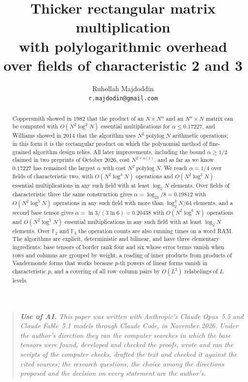 \documentclass[11pt]{article}
\title{Thicker rectangular matrix multiplication\\ with polylogarithmic overhead\\ over fields of characteristic 2 and 3}
\author{Ruhollah Majdoddin\\ \normalsize\texttt{r.majdodin@gmail.com}}
\date{}
\theoremstyle{definition}
\theoremstyle{remark}
\newcommand{\F}{\mathbb{F}}
\DeclareMathOperator{\polylog}{polylog}
\begin{document}
\maketitle

\begin{abstract}
Coppersmith showed in 1982 that the product of an $N\times N^\alpha$ and an $N^\alpha\times N$ matrix can be computed with $O(N^2\log^2N)$ essential multiplications for $\alpha\le0.17227$, and Williams showed in 2014 that the algorithm uses $N^2\polylog N$ arithmetic operations; in this form it is the rectangular product on which the polynomial method of fine-grained algorithm design relies. All later improvements, including the bound $\alpha\ge1/2$ claimed in two preprints of October 2026, cost $N^{2+o(1)}$, and as far as we know $0.17227$ has remained the largest $\alpha$ with cost $N^2\polylog N$. We reach $\alpha=1/4$ over fields of characteristic two, with $O(N^2\log^4N)$ operations and $O(N^2\log^3N)$ essential multiplications in any such field with at least $\log_2N$ elements. Over fields of characteristic three the same construction gives $\alpha=\log_23/8=0.19812$ with $O(N^2\log^5N)$ operations in any such field with more than $\log_2^3N/64$ elements, and a second base tensor gives $\alpha=\ln3/(3\ln6)=0.20438$ with $O(N^2\log^6N)$ operations and $O(N^2\log^5N)$ essential multiplications in any such field with at least $\log_2N$ elements. Over $\F_2$ and $\F_3$ the operation counts are also running times on a word RAM. The algorithms are explicit, deterministic and bilinear, and have three elementary ingredients: base tensors of border rank four and six whose error terms vanish when rows and columns are grouped by weight, a reading of inner products from products of Vandermonde forms that works because $p$-th powers of linear forms vanish in characteristic $p$, and a covering of all row--column pairs by $O(L^2)$ relabelings of $L$ levels.
\end{abstract}

\begin{quote}\small\itshape
\textbf{Use of AI.} This paper was written with Anthropic's Claude Opus~5.5 and Claude Fable~5.1 models through Claude Code, in November 2026. Under the author's direction they ran the computer searches in which the base tensors were found, developed and checked the proofs, wrote and ran the scripts of the computer checks, drafted the text and checked it against the cited sources; the research questions, the choice among the directions proposed and the decision on every statement are the author's.
\end{quote}
\end{document}
